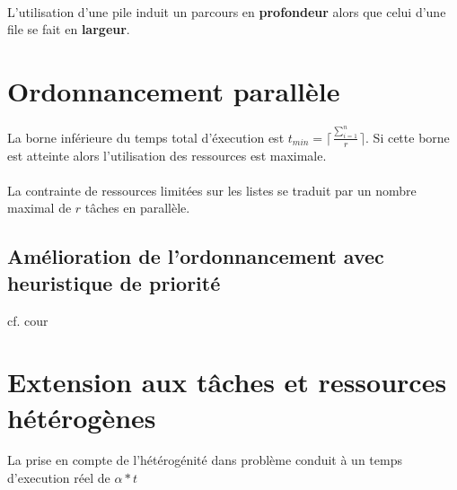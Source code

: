 \documentclass[11pt]{article}
\begin{document}
\paragraph{}
L'utilisation d'une pile induit un parcours en \textbf{profondeur} alors que celui d'une file se fait en \textbf{largeur}.

\section{Ordonnancement parallèle}
La borne inférieure du temps total d'éxecution est $t_{min}=\lceil \frac{\sum_{i=1}^{n}}{r} \rceil$. Si cette borne est atteinte alors l'utilisation des ressources est maximale.

\paragraph{ }
La contrainte de ressources limitées sur les listes se traduit par un nombre maximal de $r$ tâches en parallèle.

\subsection{Amélioration de l'ordonnancement avec heuristique de priorité}
cf. cour

\section{Extension aux tâches et ressources hétérogènes}
La prise en compte de l'hétérogénité dans problème conduit à un temps d'execution réel de $\alpha * t$

\paragraph{}
\end{document}
